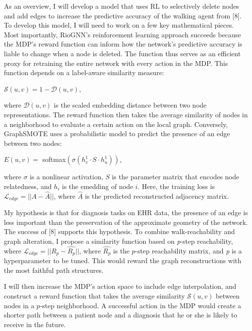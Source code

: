 \documentclass{article}
\begin{document}
As an overview, I will develop a model that uses RL to selectively delete nodes and add edges to increase the predictive accuracy of the walking agent from [8]. To develop this model, I will need to work on a few key mathematical pieces. Most importantly, RioGNN's reinforcement learning approach succeeds because the MDP's reward function can inform how the network's predictive accuracy is liable to change when a node is deleted. The function thus serves as an efficient proxy for retraining the entire network with every action in the MDP. This function depends on a label-aware similarity measure:

\begin{center}
$\mathcal{S}(u,v) = 1 - \mathcal{D}(u,v)$,
\end{center}

where $\mathcal{D}(u,v)$ is the scaled embedding distance between two node representations. The reward function then takes the average similarity of nodes in a neighborhood to evaluate a certain action on the local graph. Conversely, GraphSMOTE uses a probabilistic model to predict the presence of an edge between two nodes:
 
\begin{center}
$E(u,v) =$ softmax$(\sigma(h^1_v \cdot S \cdot h^1_u))$,
\end{center}
where $\sigma$ is a nonlinear activation, $S$ is the parameter matrix that encodes node relatedness, and $h_i$ is the emedding of node $i$. Here, the training loss is $\mathcal{L}_{edge} = ||A - \widehat{A}||$, where $\widehat{A}$ is the predicted reconstructed adjacency matrix. 

My hypothesis is that for diagnosis tasks on EHR data, the presence of an edge is less important than the preservation of the approximate geometry of the network. The success of [8] supports this hypothesis. To combine walk-reachability and graph alteration, I propose a similarity function based on \textit{p}-step reachability, where $\mathcal{L}_{edge} = ||R_p - \widehat{R_p}||$, where $\widehat{R_p}$ is the $p$-step reachability matrix, and \textit{p} is a hyperparameter to be tuned. This would reward the graph reconstructions with the most faithful path structures. 

I will then increase the MDP's action space to include edge interpolation, and construct a reward function that takes the average similarity $\mathcal{S}(u,v)$ between nodes in a $p$-step neighborhood. A successful action in the MDP would create a shorter path between a patient node and a diagnosis that he or she is likely to receive in the future. 
\end{document}
